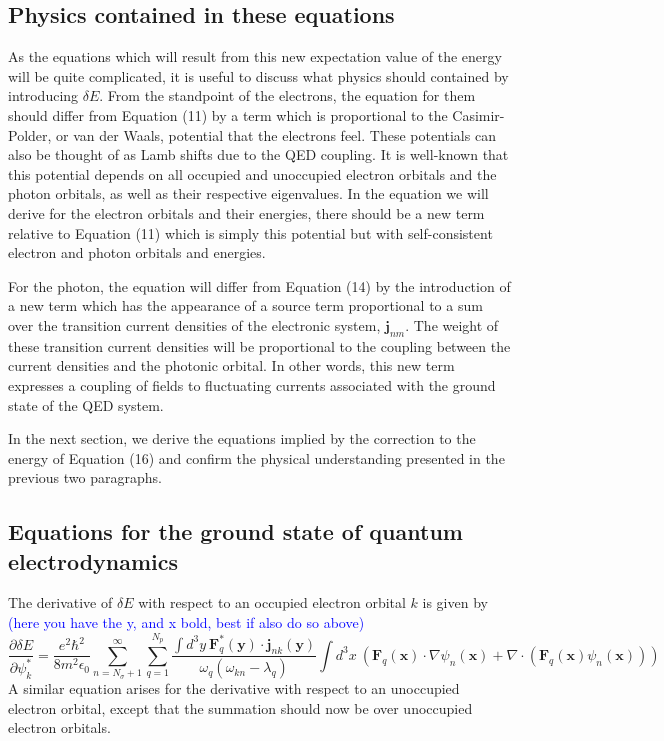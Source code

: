 \documentclass[aps,prb,onecolumn,
	groupedaddress,superscriptaddress,
	amsfonts,amssymb,amsmath,floatfix,
	citeautoscript]{revtex4-1}
\newcommand{\Jadd}[1]{\textcolor{blue}{#1}}
\begin{document}
\subsection{Physics contained in these equations}

As the equations which will result from this new expectation value of the energy will be quite complicated, it is useful to discuss what physics should contained by introducing $\delta E$. From the standpoint of the electrons, the equation for them should differ from Equation (11) by a term which is proportional to the Casimir-Polder, or van der Waals, potential that the electrons feel.  These potentials can also be thought of as Lamb shifts due to the QED coupling. It is well-known that this potential depends on all occupied and unoccupied electron orbitals and the photon orbitals, as well as their respective eigenvalues. In the equation we will derive for the electron orbitals and their energies, there should be a new term relative to Equation (11) which is simply this potential but with self-consistent electron and photon orbitals and energies.

For the photon, the equation will differ from Equation (14) by the introduction of a new term which has the appearance of a source term proportional to a sum over the transition current densities of the electronic system, $\mathbf{j}_{nm}$. The weight of these transition current densities will be proportional to the coupling between the current densities and the photonic orbital. In other words, this new term expresses a coupling of fields to fluctuating currents associated with the ground state of the QED system. 

In the next section, we derive the equations implied by the correction to the energy of Equation (16) and confirm the physical understanding presented in the previous two paragraphs.

\subsection{Equations for the ground state of quantum electrodynamics}

The derivative of $\delta E$ with respect to an occupied electron orbital $k$ is given by \Jadd{(here you have the y, and x bold, best if also do so above)}
\begin{equation}
\frac{\partial\delta E}{\partial \psi_k^*} = \frac{e^2\hbar^2}{8m^2\epsilon_0}\sum\limits_{n=N_{\sigma}+1}^{\infty}\sum\limits_{q=1}^{N_p} \frac{\int d^3y~\mathbf{F}^*_q(\mathbf{y})\cdot\mathbf{j}_{nk}(\mathbf{y})}{\omega_q(\omega_{kn}-\lambda_q)}\int d^3x~\left( \mathbf{F}_q(\mathbf{x})\cdot\nabla\psi_n(\mathbf{x}) + \nabla\cdot(\mathbf{F}_q(\mathbf{x})\psi_n(\mathbf{x}))\right)
\end{equation}
A similar equation arises for the derivative with respect to an unoccupied electron orbital, except that the summation should now be over unoccupied electron orbitals.
\end{document}
